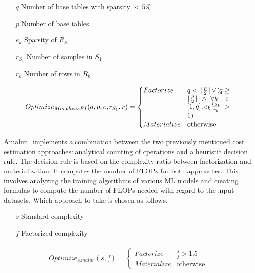 \begin{definition}
  \begin{itemize}
    \item[]
      \item[$q$]Number of base tables with sparsity $ < 5\% $
    \item[$p$] Number of base tables
    \item[$e_k$] Sparsity of $R_k$
    \item[$r_{S_1}$] Number of samples in $S_1$
    \item[$r_k$] Number of rows in $R_k$
  \end{itemize}

  \begin{align*}
    \begin{split}
      Optimize_{MorpheusFI}(q, p, e, r_{S_1}, r) =
      \begin{cases}
        Factorize   & \parbox[t]{.18\linewidth}{$q < \lfloor \frac{p}{2} \rfloor \vee ( q \geq \lfloor \frac{p}{2} \rfloor \wedge \forall k \in [1,q], e_k \frac{r_{S_1}}{r_k} > 1)$} \\
        Materialize & \text{otherwise}
      \end{cases}
    \end{split}
  \end{align*}
\end{definition}

Amalur~\cite{amalur_tkde24} implements a combination between the two previously mentioned cost estimation approaches: analytical counting of operations and a heuristic decision rule. The decision rule is based on the complexity ratio between factorization and materialization. It computes the number of FLOPs for both approaches. This involves analyzing the training algorithms of various ML models and creating formulas to compute the number of FLOPs needed with regard to the input datasets. Which approach to take is chosen as follows.

\begin{definition}

  \begin{itemize}
    \item[]
    \item[$s$] Standard complexity
    \item[$f$] Factorized complexity
  \end{itemize}

  \begin{align*}
    \begin{split}
      Optimize_{Amalur}(s, f) =
      \begin{cases}
        Factorize   & \frac{s}{f} > 1.5 \\
        Materialize & \text{otherwise}
      \end{cases}
    \end{split}
  \end{align*}
\end{definition}

